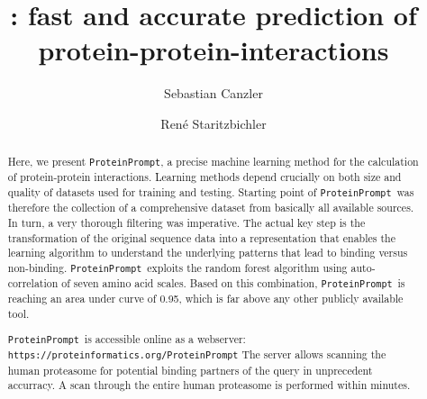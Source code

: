 \documentclass[3p,times,twocolumn]{elsarticle}
\title{\tool: fast and accurate prediction of protein-protein-interactions}
\newcommand{\url}[1]{\texttt{https://\small #1}}
\newcommand{\tool}{\texttt{ProteinPrompt}}
\newcommand{\website}{\url{proteinformatics.org/\tool}}
\begin{document}

  

%  
%  

\author[LEI,IMT]{Sebastian Canzler}
\author[PHY,IMT]{Ren\'{e} Staritzbichler}


\address[LEI]{Bioinformatics Group, Department of Computer Science,
  University of Leipzig,
  H{\"a}rtelstra{\ss}e 16-18, 04107 Leipzig, Germany
}
\address[PHY]{ProteinFormatics Group, Institute of Medical Physics and Biophysics, University of Leipzig,
  H{\"a}rtelstra{\ss}e 16-18, 04107 Leipzig, Germany.}

\address[IMT]{Immuthera GmbH, L{\"o}{\ss}niger Stra{\ss}e 16, 04275 Leipzig, Germany.}




 

\begin{abstract}

  Here, we present \tool, a precise machine learning method for the calculation of protein-protein interactions.
  Learning methods depend crucially on both size and quality of datasets used for training and testing.
  Starting point of \tool\  was therefore the collection of a comprehensive dataset from basically all available sources.
  In turn, a very thorough filtering was imperative.
  The actual key step is the transformation of the original sequence data into a representation that enables the learning algorithm to understand the underlying patterns that lead to binding versus non-binding.
   \tool\  exploits the random forest algorithm using auto-correlation of seven amino acid scales.
   Based on this combination, \tool\  is reaching an area under curve of 0.95, which is far above any other publicly available tool. 
  
  \tool\   is accessible online as a webserver:
  \website
  The server allows  scanning the human proteasome for potential binding partners of the query in unprecedent accurracy.
  A scan through the entire human proteasome is performed within minutes.  
  

\end{abstract}
\end{document}

